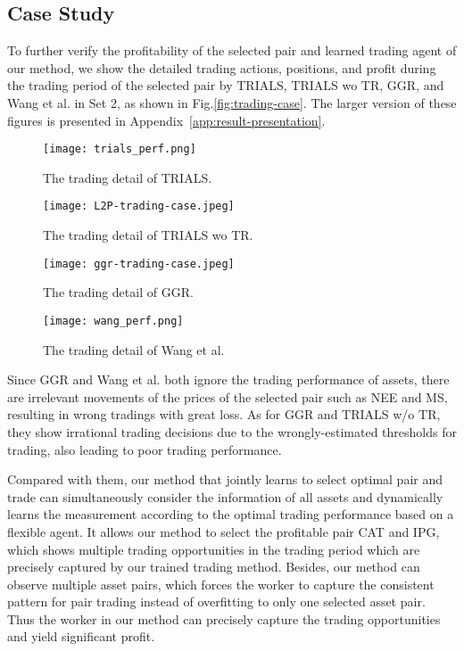 \documentclass[sigconf]{acmart}
\begin{document}
\subsection{Case Study}
To further verify the profitability of the selected pair and learned trading agent of our method,
we show the detailed trading actions, positions, and profit during the trading period of the selected pair by TRIALS, TRIALS wo TR, GGR, and Wang et al. in Set 2, as shown in Fig.\ref{fig:trading-case}.
The larger version of these figures is presented in Appendix~\ref{app:result-presentation}.
\begin{figure*}[htb]
\centering
\begin{subfigure}[b]{\columnwidth}
    \centering
    \texttt{[image: trials\_perf.png]}
    \caption{The trading detail of TRIALS.}
    \label{fig:trading-case:TRIALS}
\end{subfigure}
\hfill
\begin{subfigure}[b]{\columnwidth}
    \centering
    \texttt{[image: L2P-trading-case.jpeg]}
    \caption{The trading detail of TRIALS wo TR.}
    \label{fig:trading-case:L2P}
\end{subfigure}
\hfill
\begin{subfigure}[b]{\columnwidth}
    \centering
    \texttt{[image: ggr-trading-case.jpeg]}
    \caption{The trading detail of GGR.}
    \label{fig:trading-case:ggr}
\end{subfigure}
\hfill
\begin{subfigure}[b]{\columnwidth}
    \centering
    \texttt{[image: wang\_perf.png]}
    \caption{The trading detail of Wang et al.}
    \label{fig:trading-case:wang}
\end{subfigure}
\hfill
\caption{The trading details}
\label{fig:trading-case}
\end{figure*}
Since GGR and Wang et al. both ignore the trading performance of assets, there are irrelevant movements of the prices of the selected pair such as NEE and MS, resulting in wrong tradings with great loss.
As for GGR and TRIALS w/o TR, they show irrational trading decisions due to the wrongly-estimated thresholds for trading, also leading to poor trading performance.

Compared with them, our method that jointly learns to select optimal pair and trade can simultaneously consider the information of all assets and dynamically learns the measurement according to the optimal trading performance based on a flexible agent.
It allows our method to select the profitable pair CAT and IPG, which shows multiple trading opportunities in the trading period which are precisely captured by our trained trading method.
Besides, our method can observe multiple asset pairs, which forces the worker to capture the consistent pattern for pair trading instead of overfitting to only one selected asset pair.
Thus the worker in our method can precisely capture the trading opportunities and yield significant profit.
\end{document}
